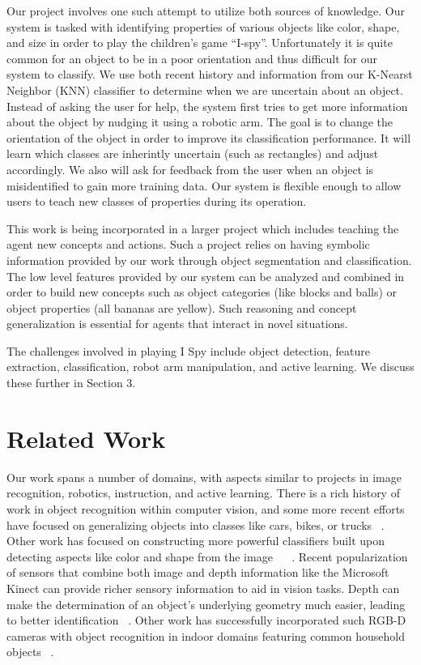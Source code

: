 \documentclass[11pt]{article}
\newcommand{\xxx}[1]{{\bf \color{red} #1}}
\begin{document}
Our project involves one such attempt to utilize both sources of knowledge. Our system is tasked with identifying properties of various objects like color, shape, and size in order to play the children's game ``I-spy''. Unfortunately it is quite common for an object to be in a poor orientation and thus difficult for our system to classify. We use both recent history and information from our K-Nearst Neighbor (KNN) classifier to determine when we are uncertain about an object. Instead of asking the user for help, the system first tries to get more information about the object by nudging it using a robotic arm. The goal is to change the orientation of the object in order to improve its classification performance. It will learn which classes are inherintly uncertain (such as rectangles) and adjust accordingly. We also will ask for feedback from the user when an object is misidentified to gain more training data. Our system is flexible enough to allow users to teach new classes of properties during its operation.

This work is being incorporated in a larger project which includes teaching the
agent new concepts and actions. Such a project relies on having
symbolic information provided by our work through object segmentation and
classification. The low level features provided by our system can be analyzed and
combined in order to build new concepts such as object categories (like blocks
and balls) or object properties (all bananas are yellow). Such reasoning and
concept generalization is essential for agents that interact in novel situations.

The challenges involved in playing I Spy include object detection, feature
extraction, classification, robot arm manipulation, and active learning. We
discuss these further in Section 3.

\section{Related Work}

Our work spans a number of domains, with aspects similar to projects in image recognition, robotics, instruction, and active learning. There is a rich history of work in object recognition within computer vision, and some more recent efforts have focused on generalizing objects into classes like cars, bikes, or trucks ~\cite{huber2004parts}. Other work has focused on constructing more powerful classifiers built upon detecting aspects like color and shape from the image ~\cite{nilsback2006visual} ~\cite{gehler2009feature}. Recent popularization of sensors that combine both image and depth information like the Microsoft Kinect can provide richer sensory information to aid in vision tasks. Depth can make the determination of an object's underlying geometry much easier, leading to better identification ~\cite{marton2010hierarchical}. Other work has successfully incorporated such RGB-D cameras with object recognition in indoor domains featuring common household objects ~\cite{marton2010hierarchical, lai2011sparse}.
\end{document}
